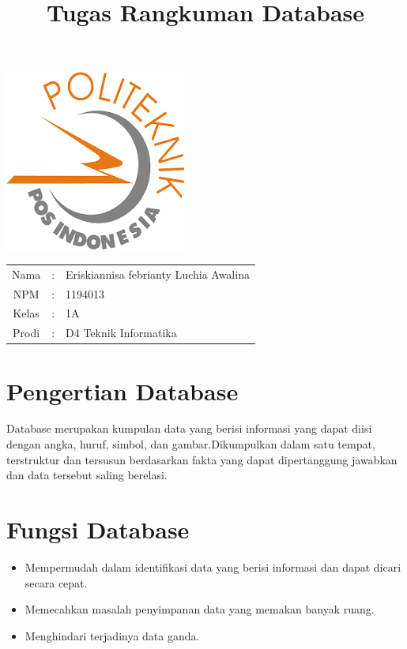 \documentclass{article}
\title{Tugas Rangkuman Database}
\author{}
\date{}
\begin{document}
\maketitle
\begin{center}
\includegraphics{download.png}
\end{center}
\hfill\break

\begin{center}
\begin{tabular}{c c l}

    Nama & : & Eriskiannisa febrianty Luchia Awalina\\
    NPM & : & 1194013\\
    Kelas & : & 1A\\
    Prodi & : & D4 Teknik Informatika\\

\end{tabular}
\end{center}

\newpage
\section{Pengertian Database}
Database merupakan kumpulan data yang berisi informasi yang dapat diisi dengan angka, huruf, simbol, dan gambar.Dikumpulkan dalam satu tempat, terstruktur dan tersusun berdasarkan fakta yang dapat dipertanggung jawabkan dan data tersebut saling berelasi.


\section{Fungsi Database}
\begin{itemize}
\item Mempermudah dalam identifikasi data yang berisi informasi dan dapat dicari secara cepat.
\item Memecahkan masalah penyimpanan data yang memakan banyak ruang.
\item Menghindari terjadinya data ganda.
\end{itemize}
\end{document}
